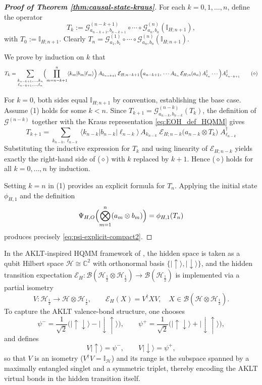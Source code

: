 \documentclass[11pt,a4paper]{article}
\begin{document}
\begin{proof}[\textbf{Proof of Theorem \ref{thm:causal-state-kraus}}]
For each \(k = 0,1,\dots,n\), define the operator
\[
T_k := \mathcal{G}^{(n-k+1)}_{a_{n-k+1},b_{n-k+1}} \circ \cdots \circ \mathcal{G}^{(n)}_{a_n,b_n} (\mathbb{I}_{H;n+1}),
\]
with \(T_0 := \mathbb{I}_{H;n+1}\).  Clearly \(T_n = \mathcal{G}^{(1)}_{a_1,b_1}\circ\cdots\circ\mathcal{G}^{(n)}_{a_n,b_n}(\mathbb{I}_{H;n+1})\).

We prove by induction on \(k\) that
\[
T_k = \sum_{\substack{k_{n-k+1},\dots,k_n\\ \ell_{n-k+1},\dots,\ell_n}}
\Bigl(\prod_{m=n-k+1}^{n} \langle k_m|b_m|\ell_m\rangle\Bigr)
\,
A_{k_{n-k+1}}\,
\mathcal{E}_{H;n-k+1}\Bigl(
a_{n-k+1},\,
\cdots
A_{k_n}\,\mathcal{E}_{H;n}(a_n)\,A_{\ell_n}^\dagger
\cdots
\Bigr)
A_{\ell_{n-k+1}}^\dagger \tag{$\diamond$}
\]

For \(k = 0\), both sides equal \(\mathbb{I}_{H;n+1}\) by convention, establishing the base case.  Assume (1) holds for some \(k < n\).  Since \(T_{k+1} = \mathcal{G}^{(n-k)}_{a_{n-k},b_{n-k}}(T_k)\), the definition of \(\mathcal{G}^{(n-k)}\) together with the Kraus representation \eqref{eq:EOH_def_HQMM} gives
\[
T_{k+1} = \sum_{k_{n-k},\ell_{n-k}} \langle k_{n-k}|b_{n-k}|\ell_{n-k}\rangle \,
A_{k_{n-k}}\; \mathcal{E}_{H;n-k}\bigl( a_{n-k}\otimes T_k \bigr) \; A_{\ell_{n-k}}^\dagger
\]
Substituting the inductive expression for \(T_k\) and using linearity of \(\mathcal{E}_{H;n-k}\) yields exactly the right-hand side of ($\diamond$) with \(k\) replaced by \(k+1\).  Hence ($\diamond$) holds for all \(k = 0,\dots,n\) by induction.

Setting \(k = n\) in (1) provides an explicit formula for \(T_n\).  Applying the initial state \(\phi_{H,1}\) and the definition
\[
\Psi_{H,O}\Bigl(\bigotimes_{m=1}^n (a_m\otimes b_m)\Bigr) = \phi_{H,1}(T_n)
\]
produces precisely \eqref{eq:psi-explicit-compact2}. 
\end{proof}

In the AKLT-inspired HQMM framework of \cite{SA26}, the hidden space is taken as a qubit Hilbert space $\mathcal{H}\cong\mathbb{C}^2$ with orthonormal basis $\{|\uparrow\rangle,|\downarrow\rangle\}$, and the hidden transition expectation
\(
\mathcal{E}_{H} : \mathcal{B}(\mathcal{H}_{\frac{1}{2}}\otimes\mathcal{H}_{\frac{1}{2}})\to\mathcal{B}(\mathcal{H}_{\frac{1}{2}})
\)
is implemented via a partial isometry
\[
V:\mathcal{H}_{\frac{1}{2}}\longrightarrow\mathcal{H}\otimes\mathcal{H}_{\frac{1}{2}},
\qquad
\mathcal{E}_{H}(X)=V^\dagger X V,
\quad X\in\mathcal{B}(\mathcal{H}\otimes\mathcal{H}_{\frac{1}{2}}).
\]
To capture the AKLT valence-bond structure, one chooses
\[
\psi^-=\frac{1}{\sqrt{2}}\bigl(|\uparrow\downarrow\rangle-|\downarrow\uparrow\rangle\bigr),
\qquad
\psi^+=\frac{1}{\sqrt{2}}\bigl(|\uparrow\downarrow\rangle+|\downarrow\uparrow\rangle\bigr),
\]
and defines
\[
V|\uparrow\rangle=\psi^-,
\qquad
V|\downarrow\rangle=\psi^+,
\]
so that $V$ is an isometry ($V^\dagger V=\mathbb{I}_{\mathcal{H}}$) and its range is the subspace spanned by a maximally entangled singlet and a symmetric triplet, thereby encoding the AKLT virtual bonds in the hidden transition itself.
\end{document}
